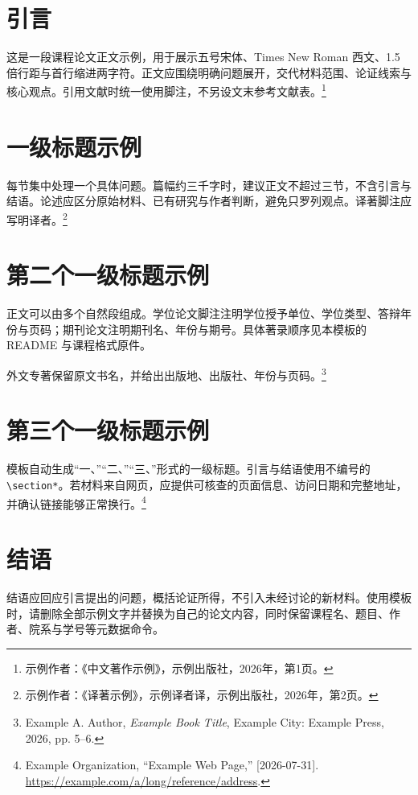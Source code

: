 \documentclass{main}
\begin{document}
\makepages

\section*{引言}

这是一段课程论文正文示例，用于展示五号宋体、Times New Roman 西文、1.5 倍行距与首行缩进两字符。正文应围绕明确问题展开，交代材料范围、论证线索与核心观点。引用文献时统一使用脚注，不另设文末参考文献表。\footnote{示例作者：《中文著作示例》，示例出版社，2026年，第1页。}

\section{一级标题示例}

每节集中处理一个具体问题。篇幅约三千字时，建议正文不超过三节，不含引言与结语。论述应区分原始材料、已有研究与作者判断，避免只罗列观点。译著脚注应写明译者。\footnote{示例作者：《译著示例》，示例译者译，示例出版社，2026年，第2页。}

\section{第二个一级标题示例}

正文可以由多个自然段组成。学位论文脚注注明学位授予单位、学位类型、答辩年份与页码；期刊论文注明期刊名、年份与期号。具体著录顺序见本模板的 README 与课程格式原件。

外文专著保留原文书名，并给出出版地、出版社、年份与页码。\footnote{Example A. Author, \textit{Example Book Title}, Example City: Example Press, 2026, pp. 5--6.}

\section{第三个一级标题示例}

模板自动生成“一、”“二、”“三、”形式的一级标题。引言与结语使用不编号的 \verb|\section*|。若材料来自网页，应提供可核查的页面信息、访问日期和完整地址，并确认链接能够正常换行。\footnote{Example Organization, “Example Web Page,” [2026-07-31]. \url{https://example.com/a/long/reference/address}.}

\section*{结语}

结语应回应引言提出的问题，概括论证所得，不引入未经讨论的新材料。使用模板时，请删除全部示例文字并替换为自己的论文内容，同时保留课程名、题目、作者、院系与学号等元数据命令。
\end{document}
